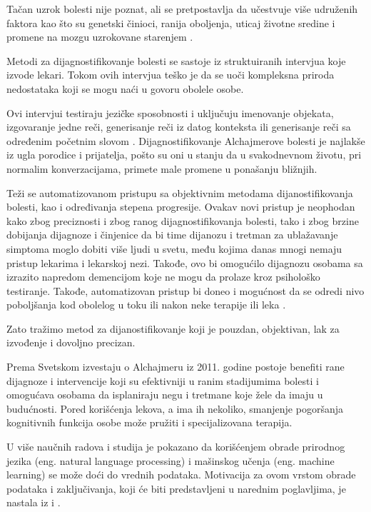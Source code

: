 \documentclass[12pt,oneside]{memoir}
\begin{document}
Tačan uzrok bolesti nije poznat, ali se pretpostavlja da učestvuje više udruženih faktora kao što su genetski činioci, ranija oboljenja, uticaj životne sredine i promene na mozgu uzrokovane starenjem \cite{medicor}.

Metodi za dijagnostifikovanje bolesti se sastoje iz struktuiranih intervjua koje izvode lekari. Tokom ovih intervjua teško je da se uoči kompleksna priroda nedostataka koji se mogu naći u govoru obolele osobe.

Ovi intervjui testiraju jezičke sposobnosti i uključuju imenovanje objekata, izgovaranje jedne reči, generisanje reči iz datog konteksta ili generisanje reči sa određenim početnim slovom \cite{automaticdetandrat}. Dijagnostifikovanje Alchajmerove bolesti je najlakše iz ugla porodice i prijatelja, pošto su oni u stanju da u svakodnevnom životu, pri normalim konverzacijama, primete male promene u ponašanju bližnjih.

Teži se automatizovanom pristupu sa objektivnim metodama dijanostifikovanja bolesti, kao i određivanja stepena progresije. Ovakav novi pristup je neophodan kako zbog preciznosti i zbog ranog dijagnostifikovanja bolesti, tako i zbog brzine dobijanja dijagnoze i činjenice da bi time dijanozu i tretman za ublažavanje simptoma moglo dobiti više ljudi u svetu, među kojima danas mnogi nemaju pristup lekarima i lekarskoj nezi. Takođe, ovo bi omogućilo dijagnozu osobama sa izrazito napredom demencijom koje ne mogu da prolaze kroz psihološko testiranje. Takođe, automatizovan pristup bi doneo i mogućnost da se odredi nivo poboljšanja kod obolelog u toku ili nakon neke terapije ili leka \cite{Evaloftechfolexicalperformance}.

Zato tražimo metod za dijanostifikovanje koji je pouzdan, objektivan, lak za izvođenje i dovoljno precizan.

Prema Svetskom izvestaju o Alchajmeru iz 2011. godine postoje benefiti rane dijagnoze i intervencije koji su efektivniji u ranim stadijumima bolesti i omogućava osobama da isplaniraju negu i tretmane koje žele da imaju u budućnosti. Pored korišćenja lekova, a ima ih nekoliko, smanjenje pogoršanja kognitivnih funkcija osobe može pružiti i specijalizovana terapija.

U više naučnih radova i studija je pokazano da korišćenjem obrade prirodnog jezika (eng. natural language processing) i mašinskog učenja (eng. machine learning) se može doći do vrednih podataka. Motivacija za ovom vrstom obrade podataka i zaključivanja, koji će biti predstavljeni u narednim poglavljima, je nastala iz \cite{automaticdetandrat} i \cite{linguisticfeatures}.
\end{document}
